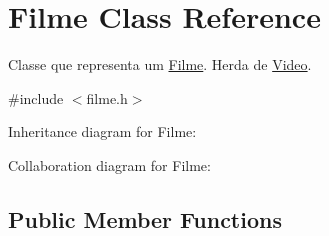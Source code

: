\hypertarget{classFilme}{}\section{Filme Class Reference}
\label{classFilme}


Classe que representa um \hyperlink{classFilme}{Filme}. Herda de \hyperlink{classVideo}{Video}.  




{\ttfamily \#include $<$filme.\+h$>$}



Inheritance diagram for Filme\+:


Collaboration diagram for Filme\+:
\subsection*{Public Member Functions}
